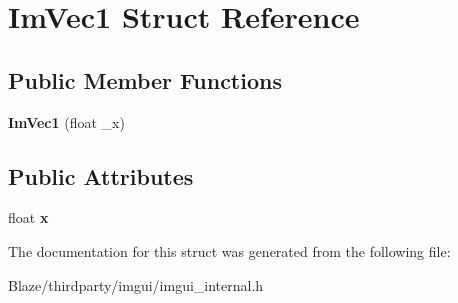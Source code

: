\hypertarget{structImVec1}{}\section{Im\+Vec1 Struct Reference}
\label{structImVec1}
\subsection*{Public Member Functions}
\begin{DoxyCompactItemize}
\item 
\mbox{\label{structImVec1_aa17cbbe4525aa75d2ca65316fb2c0df9}} 
{\bfseries Im\+Vec1} (float \+\_\+x)
\end{DoxyCompactItemize}
\subsection*{Public Attributes}
\begin{DoxyCompactItemize}
\item 
\mbox{\label{structImVec1_a825500197aa4fe7c4aa563ae547fd29b}} 
float {\bfseries x}
\end{DoxyCompactItemize}


The documentation for this struct was generated from the following file\+:\begin{DoxyCompactItemize}
\item 
Blaze/thirdparty/imgui/imgui\+\_\+internal.\+h\end{DoxyCompactItemize}
